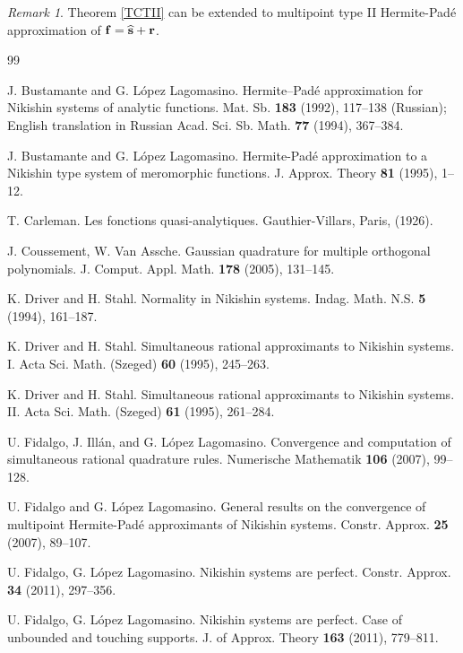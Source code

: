 \documentclass[10pt,a4paper]{article}
\theoremstyle{definition}
\theoremstyle{remark}
\newtheorem{remark}[theorem]{Remark}
\numberwithin{equation}{section}
\begin{document}
\begin{remark} Theorem \ref{TCTII} can be extended to multipoint type II Hermite-Pad\'e approximation of ${\bf f}= \widehat{\bf s} + {\bf r}$.
\end{remark}



\begin{thebibliography}{99}

 J. Bustamante and G. L\'opez Lagomasino.   Hermite--Pad\'e approximation for Nikishin systems of analytic functions. Mat. Sb. {\bf 183} (1992), 117--138 (Russian); English translation in Russian Acad. Sci. Sb. Math. {\bf 77} (1994), 367--384.

 J. Bustamante   and G. L\'opez Lagomasino.  Hermite-Pad\'e approximation to a Nikishin type system of meromorphic functions. J. Approx. Theory {\bf 81} (1995), 1--12.

 T. Carleman.    Les fonctions quasi-analytiques.  Gauthier-Villars, Paris, (1926).

 J. Coussement, W. Van Assche.   Gaussian quadrature for multiple orthogonal polynomials. J. Comput. Appl. Math. {\bf 178} (2005), 131--145.

 K. Driver and H. Stahl.   Normality in Nikishin systems. Indag. Math. N.S. {\bf 5} (1994), 161--187.

 K. Driver and H. Stahl. Simultaneous rational approximants to Nikishin systems. I. Acta Sci. Math. (Szeged) {\bf 60} (1995), 245--263.

 K. Driver and H. Stahl.  Simultaneous rational approximants to Nikishin systems. II. Acta Sci. Math. (Szeged) {\bf 61} (1995), 261--284.

   U. Fidalgo, J. Ill\'an, and G. L\'opez Lagomasino.   Convergence and computation of simultaneous rational quadrature rules. Numerische Mathematik {\bf 106} (2007), 99--128.

 U. Fidalgo and G. L\'opez Lagomasino. General results on the convergence of  multipoint Hermite-Pad\'e approximants of Nikishin systems. Constr. Approx. {\bf 25} (2007), 89--107.

 U. Fidalgo, G. L\'opez Lagomasino.   Nikishin systems are perfect. Constr. Approx. {\bf 34} (2011), 297--356.

  U. Fidalgo, G. L\'opez Lagomasino.  Nikishin systems are perfect. Case of unbounded and touching supports. J. of Approx. Theory  {\bf 163} (2011), 779--811.


\end{thebibliography}
\end{document}
